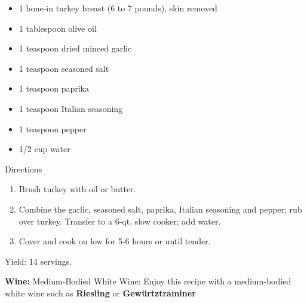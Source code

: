 
\begin{itemize}
\item
  1 bone-in turkey breast (6 to 7 pounds), skin removed
\item
  1 tablespoon olive oil
\item
  1 teaspoon dried minced garlic
\item
  1 teaspoon seasoned salt
\item
  1 teaspoon paprika
\item
  1 teaspoon Italian seasoning
\item
  1 teaspoon pepper
\item
  1/2 cup water
\end{itemize}

Directions

\begin{enumerate}
\def\labelenumi{\arabic{enumi}.}
\item
  Brush turkey with oil or butter.
\item
  Combine the garlic, seasoned salt, paprika, Italian seasoning and
  pepper; rub over turkey. Transfer to a 6-qt. slow cooker; add water.
\item
  Cover and cook on low for 5-6 hours or until tender.
\end{enumerate}

Yield: 14 servings.

\textbf{Wine: }Medium-Bodied White Wine: Enjoy this recipe with a
medium-bodied white wine such
as \textbf{Riesling} or \textbf{Gewürtztraminer}

